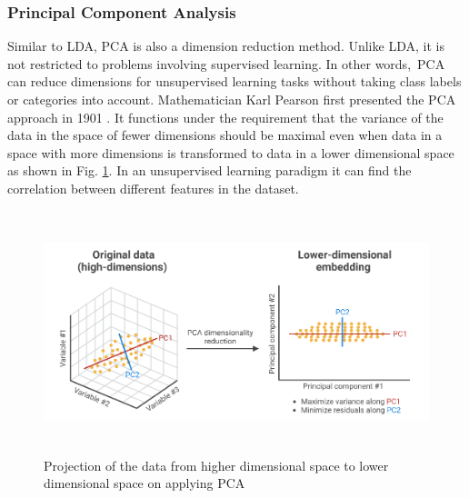 \subsubsection{Principal Component Analysis}
Similar to \ac{LDA}, \ac{PCA} is also a dimension reduction method. Unlike \ac{LDA}, it is not restricted to problems involving supervised learning. In other words, PCA can reduce dimensions for unsupervised learning tasks without taking class labels or categories into account. Mathematician Karl Pearson first presented the \ac{PCA} approach in 1901 \cite{sanguansat2012principal}. It functions under the requirement that the variance of the data in the space of fewer dimensions should be maximal even when data in a space with more dimensions is transformed to data in a lower dimensional space as shown in Fig. \ref{fig:pca}. In an unsupervised learning paradigm it can find the correlation between different features in the dataset.
\begin{figure}[t]
  \centering
  \includegraphics[width=350pt,height=200pt]{pictures/pca.PNG}
  \caption{Projection of the data from higher dimensional space to lower dimensional space on applying \ac{PCA}\cite{pca}}
  \label{fig:pca}
\end{figure} 

